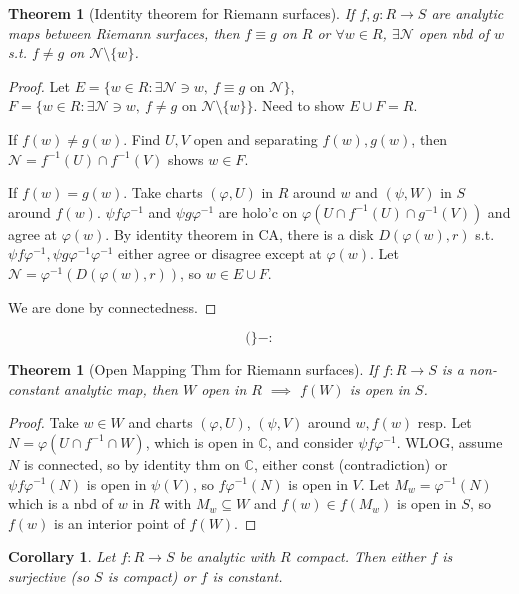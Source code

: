 \documentclass{article}
\theoremstyle{definition}
\theoremstyle{remark}
\theoremstyle{plain}
\newtheorem{thm}[defn]{Theorem}
\newtheorem{crly}[defn]{Corollary}
\newcommand{\CC}{\mathbb{C}}
\begin{document}
\begin{thm}[Identity theorem for Riemann surfaces]
    If $f,g:R\to S$ are analytic maps between Riemann surfaces, then $f\equiv g$ on $R$ or $\forall w\in R$, $\exists \mathcal N$ open nbd of $w$ s.t. $f\neq g$ on $\mathcal N\setminus\{w\}$.
\end{thm}
\begin{proof}
    Let $E=\{w\in R:\exists\mathcal N\ni w,\ f\equiv g\text{ on }\mathcal N\}$, $F=\{w\in R:\exists\mathcal N\ni w,\ f\neq g\text{ on }\mathcal N\setminus\{w\}\}$. Need to show $E\cup F= R$.

    If $f(w)\neq g(w)$. Find $U,V$ open and separating $f(w),g(w)$, then $\mathcal N=f^{-1}(U)\cap f^{-1}(V)$ shows $w\in F$.

    If $f(w)=g(w)$. Take charts $(\varphi, U)$ in $R$ around $w$ and $(\psi, W)$ in $S$ around $f(w)$. $\psi f\varphi^{-1}$ and $\psi g\varphi^{-1}$ are holo'c on $\varphi(U\cap f^{-1}(U)\cap g^{-1}(V))$ and agree at $\varphi(w)$. By identity theorem in CA, there is a disk $D(\varphi(w),r)$ s.t. $\psi f\varphi^{-1},\psi g\varphi^{-1}\varphi^{-1}$ either agree or disagree except at $\varphi(w)$. Let $\mathcal N=\varphi^{-1}(D(\varphi(w),r))$, so $w\in E\cup F$.

    We are done by connectedness.
\end{proof}
\[(\}-:\tag{Owen's Signature with moustache}\]
\begin{thm}[Open Mapping Thm for Riemann surfaces]
    If $f:R\to S$ is a non-constant analytic map, then $W$ open in $R$ $\implies$ $f(W)$ is open in $S$.
\end{thm}
\begin{proof}
    Take $w\in W$ and charts $(\varphi, U)$, $(\psi, V)$ around $w, f(w)$ resp. Let $N=\varphi(U\cap f^{-1}\cap W)$, which is open in $\CC$, and consider $\psi f\varphi^{-1}$. WLOG, assume $N$ is connected, so by identity thm on $\CC$, either const (contradiction) or $\psi f\varphi^{-1}(N)$ is open in $\psi(V)$, so $f\varphi^{-1}(N)$ is open in $V$. Let $M_w=\varphi^{-1}(N)$ which is a nbd of $w$ in $R$ with $M_w\subseteq W$ and $f(w)\in f(M_w)$ is open in $S$, so $f(w)$ is an interior point of $f(W)$.
\end{proof}
\begin{crly}
    Let $f:R\to S$ be analytic with $R$ compact. Then either $f$ is surjective (so $S$ is compact) or $f$ is constant. 
\end{crly}
\end{document}
